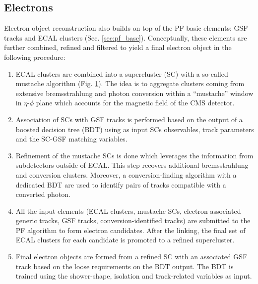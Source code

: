 \subsection{Electrons}\label{sec:reco_e}
Electron object reconstruction \cite{CMS:2020uim} also builds on top of the PF basic elements: GSF tracks and ECAL clusters (Sec. \ref{sec:pf_base}). Conceptually, these elements are further combined, refined and filtered to yield a final electron object in the following procedure: 
\begin{enumerate}

\begin{figure}[ht!]
    \centering
    \texttt{[image: Figures/CP\_etau/mustache.png]}
    \caption{Distribution of PF clusters around the seed cluster for simulated electrons with $1 < E_T^{\text{seed}} < 10~\text{GeV}$ and $1.48 < \eta^{\text{seed}} < 1.75$ \cite{CMS:2020uim}. The $z$ axis shows the number of PF clusters around the seed matched to simulation. The red line illustrates the region where the clusters are selected by the mustache algorithm.}
    \label{fig:mustache}
\end{figure}

    \item ECAL clusters are combined into a supercluster (SC) with a so-called mustache algorithm (Fig. \ref{fig:mustache}). The idea is to aggregate clusters coming from extensive bremsstrahlung and photon conversion within a \enquote{mustache} window in $\eta$-$\phi$ plane which accounts for the magnetic field of the CMS detector.

    \item Association of SCs with GSF tracks is performed based on the output of a boosted decision tree (BDT) using as input SCs observables, track parameters and the SC-GSF matching variables.
    \item Refinement of the mustache SCs is done which leverages the information from subdetectors outside of ECAL. This step recovers additional bremsstrahlung and conversion clusters. Moreover, a conversion-finding algorithm \cite{CMS:2015myp} with a dedicated BDT are used to identify pairs of tracks compatible with a converted photon.
    
    \item All the input elements (ECAL clusters, mustache SCs, electron associated generic tracks, GSF tracks, conversion-identified tracks) are submitted to the PF algorithm to form electron candidates. After the linking, the final set of ECAL clusters for each candidate is promoted to a refined supercluster.
    
    \item Final electron objects are formed from a refined SC with an associated GSF track based on the loose requirements on the BDT output. The BDT is trained using the shower-shape, isolation and track-related variables as input.
\end{enumerate}


